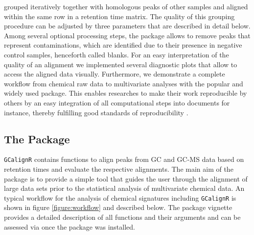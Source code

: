 grouped iteratively together with homologous peaks of other samples and
aligned within the same row in a retention time matrix. The quality of
this grouping procedure can be adjusted by three parameters that are
described in detail below. Among several optional processing steps, the
package allows to remove peaks that represent contaminations, which are
identified due to their presence in negative control samples, henceforth
called blanks. For an easy interpretation of the quality of an alignment
we implemented several diagnostic plots that allow to access the aligned
data visually. Furthermore, we demonstrate a complete workflow from
chemical raw data to multivariate analyses with the popular and widely
used
\href{https://cran.r-project.org/web/packages/vegan/index.html}{}
\citep{Oksanen.2016} package. This enables researches to make their work
reproducible by others by an easy integration of all computational steps
into  documents \citep{Allaire.2016} for instance,
thereby fulfilling good standards of reproducibility \citep{Peng.2011}.

\subsection{The Package}\label{the-package}

\texttt{GCalignR} contains functions to align peaks from GC and GC-MS
data based on retention times and evaluate the respective alignments.
The main aim of the package is to provide a simple tool that guides the
user through the alignment of large data sets prior to the statistical
analysis of multivariate chemical data. An typical workflow for the
analysis of chemical signatures including \texttt{GCalignR} is shown in
figure \ref{figure:workflow} and described below. The package vignette
provides a detailed description of all functions and their arguments and
can be assessed via  once the package
was installed.

